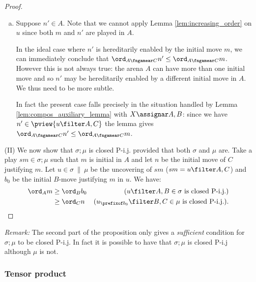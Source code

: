 \begin{proof}
\begin{enumerate}[1)]
\begin{itemize}[-]
\begin{enumerate}[a.]
            \item Suppose $n'\in A$.
        Note that we cannot apply Lemma \ref{lem:increasing_order} on $u$ since both $m$ and $n'$ are played in $A$.

        In the ideal case where $n'$ is hereditarily enabled by the initial move $m$, we can immediately conclude that $\ord_{A\fngamear C} n' \leq \ord_{A\fngamear C} m$. However this is not always true: the arena $A$ can have more than one initial move and so $n'$ may be hereditarily enabled by a different initial move in $A$. We thus need to be more subtle.

In fact the present case falls precisely in the situation handled by Lemma \ref{lem:compos_auxiliary_lemma} with $X \assignar A,B$: since we have $n' \in \pview{u \filter A,C}$ the lemma gives $\ord_{A\fngamear C} n' \leq \ord_{A\fngamear C} m$.

            \end{enumerate}
        \end{itemize}

    \end{enumerate}

\noindent (II) We now show that $\sigma;\mu$ is closed P-i.j.
provided that both $\sigma$ and $\mu$ are. Take a play $s m \in
\sigma ; \mu$ such that $m$ is initial in $A$ and let $n$ be the
initial move of $C$ justifying $m$. Let $u \in \sigma \ \|\ \mu$ be
the uncovering of $s m$ ($s m = u \filter A,C$) and $b_0$ be the
initial $B$-move justifying $m$ in $u$.
 We have:
\begin{align*}
\ord_A m & \geq \ord_B b_0 & \mbox{($u \filter A,B \in \sigma$ is closed P-i.j.)} \\
 & \geq \ord_C n & \mbox{($u_{\prefixof b_0} \filter B,C \in \mu $ is closed P-i.j.)}.
\end{align*}
\end{proof}

{\it Remark:} The second part of the proposition only gives a
\emph{sufficient} condition for $\sigma ; \mu$ to be closed P-i.j.
In fact it is possible to have that $\sigma ; \mu$ is closed P-i.j
although $\mu$ is not.


\subsubsection{Tensor product}

